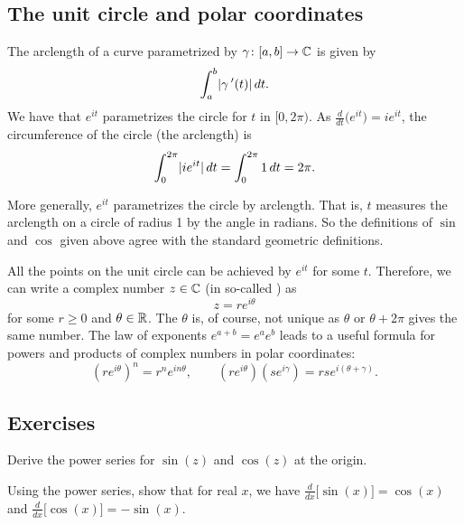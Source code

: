 \subsection{The unit circle and polar coordinates}

The arclength of a curve parametrized by $\gamma \colon [a,b] \to {\mathbb{C}}$ is given
by
\begin{equation*}
\int_a^b \lvert {\gamma^{\:\prime}(t)} \rvert \, dt .
\end{equation*}
We have that $e^{it}$ parametrizes the circle for $t$ in $[0,2\pi)$.
As $\frac{d}{dt} \bigl( e^{it} \bigr) = ie^{it}$, the circumference of the
circle (the arclength) is
\begin{equation*}
\int_0^{2\pi} \lvert {i e^{it}} \rvert  \,  dt
=
\int_0^{2\pi} 1  \,  dt  = 2\pi .
\end{equation*}

More generally, $e^{it}$ parametrizes the circle by arclength.
That is, $t$ measures the arclength on a circle of radius 1 by
the angle in radians.  So the definitions of $\sin$ and $\cos$ given
above agree with the standard geometric definitions.

All the points on the unit circle can be achieved by
$e^{it}$ for some $t$.
Therefore,
we can write
a complex number $z \in {\mathbb{C}}$
(in so-called \emph{}) as
\begin{equation*}
z = r e^{i\theta}
\end{equation*}
for some $r \geq 0$ and $\theta \in {\mathbb{R}}$.  The $\theta$ is, of course,
not unique as $\theta$ or $\theta+2\pi$ gives the same number.
The law of exponents $e^{a+b} = e^a e^b$ leads to a useful formula for powers
and products of complex numbers in polar coordinates:
\begin{equation*}
{(r e^{i\theta})}^n
= r^n e^{i n \theta} ,
\qquad
(r e^{i\theta})
(s e^{i\gamma})
=
rs e^{i(\theta+\gamma)} .
\end{equation*}

\subsection{Exercises}

\begin{exercise}
Derive the power series for $\sin(z)$ and $\cos(z)$ at the origin.
\end{exercise}

\begin{exercise}
Using the power series, show that for real $x$, we have
$\frac{d}{dx} \bigl[ \sin(x)\bigr] = \cos(x)$ and
$\frac{d}{dx} \bigl[ \cos(x)\bigr] = -\sin(x)$.
\end{exercise}

